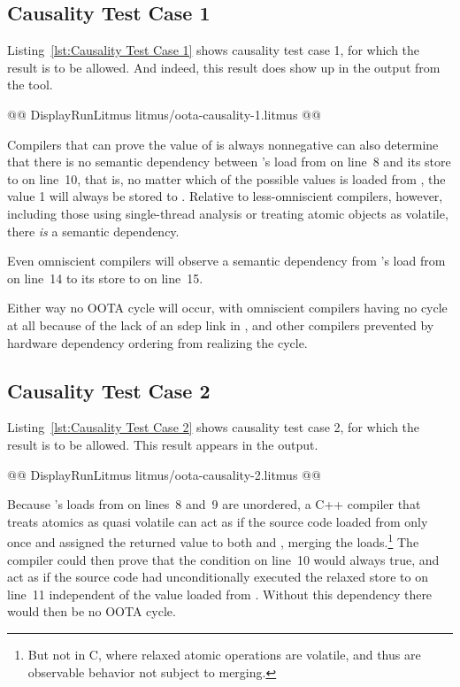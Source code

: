 \documentclass[10]{article}
\begin{document}
\subsection{Causality Test Case 1}
\label{app:Causality Test Case 1}

Listing~\ref{lst:Causality Test Case 1}
shows causality test case 1, for which the  result
is to be allowed.
And indeed, this result does show up in the output from the  tool.

\begin{listing}[tbp]
@@ DisplayRunLitmus litmus/oota-causality-1.litmus @@
\caption{Causality Test Case 1}
\label{lst:Causality Test Case 1}
\end{listing}

Compilers that can prove the value of  is always
nonnegative can also determine that there is no semantic dependency between
's load from  on line~8 and its store to  on line~10,
that is, no matter which of the possible values is loaded from ,
the value 1 will always be stored to .
Relative to less-omniscient compilers, however,
including those using single-thread analysis or treating atomic
objects as volatile, there \emph{is} a semantic dependency.

Even omniscient compilers will observe a semantic dependency from
's load from  on line~14 to its store to  on line~15.

Either way no OOTA cycle will occur, with omniscient compilers
having no cycle at all because of the lack of an sdep link in ,
and other compilers prevented by hardware
dependency ordering from realizing the cycle.

\subsection{Causality Test Case 2}
\label{app:Causality Test Case 2}

Listing~\ref{lst:Causality Test Case 2}
shows causality test case 2, for which the  result
is to be allowed.
This result appears in the  output.

\begin{listing}[tbp]
@@ DisplayRunLitmus litmus/oota-causality-2.litmus @@
\caption{Causality Test Case 2}
\label{lst:Causality Test Case 2}
\end{listing}

Because 's loads from  on lines~8 and~9 are unordered,
a C++ compiler that treats atomics as quasi volatile
can act as if the source code loaded from  only
once and assigned the returned value to both  and ,
merging the loads.\footnote{
	But not in C, where relaxed atomic operations are volatile,
	and thus are observable behavior not subject to merging.}
The compiler could then prove that the condition on line~10
would always true, and act as if the source code had
unconditionally executed the relaxed store to  on line~11
independent of the value loaded from .
Without this dependency there would then be no OOTA cycle.
\end{document}
